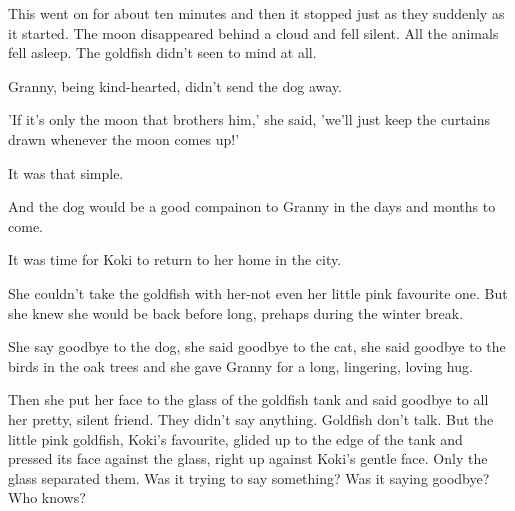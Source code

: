 \par
This went on for about ten minutes and then it stopped just as they suddenly as it started. The moon disappeared behind a cloud and fell silent. All the animals fell asleep. The goldfish didn't seen to mind at all.
\par
Granny, being kind-hearted, didn't send the dog away.
\par
'If it's only the moon that brothers him,' she said, 'we'll just keep the curtains drawn whenever the moon comes up!'
\par
It was that simple.
\par
And the dog would be a good compainon to Granny in the days and months to come.
\par
It was time for Koki to return to her home in the city.
\par
She couldn't take the goldfish with her-not even her little pink favourite one. But she knew she would be back before long, prehaps during the winter break.
\par
She say goodbye to the dog, she said goodbye to the cat, she said goodbye to the birds in the oak trees and she gave Granny for a long, lingering, loving hug.
\par
Then she put her face to the glass of the goldfish tank and said goodbye to all her pretty, silent friend. They didn't say anything. Goldfish don't talk. But the little pink goldfish, Koki's favourite, glided up to the edge of the tank and pressed its face against the glass, right up against Koki's gentle face. Only the glass separated them. Was it trying to say something? Was it saying goodbye? Who knows?
